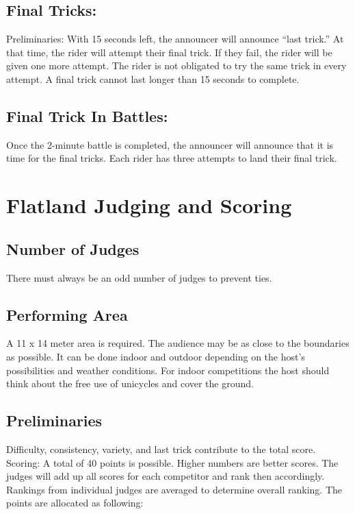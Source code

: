 \subsection{Final Tricks:}
Preliminaries: With 15 seconds left, the announcer will announce ``last trick.''
At that time, the rider will attempt their final trick.
If they fail, the rider will be given one more attempt.
The rider is not obligated to try the same trick in every attempt.
A final trick cannot last longer than 15 seconds to complete.

\subsection{Final Trick In Battles:}
Once the 2-minute battle is completed, the announcer will announce that it is time for the final tricks.
Each rider has three attempts to land their final trick.

\section{Flatland Judging and Scoring \label{sec:flat-street_flatland-judging-scoring}}

\subsection{Number of Judges}
There must always be an odd number of judges to prevent ties. 

\subsection{Performing Area}
A 11 x 14 meter area is required.
The audience may be as close to the boundaries as possible.
It can be done indoor and outdoor depending on the host's possibilities and weather conditions.
For indoor competitions the host should think about the free use of unicycles and cover the ground.

\subsection{Preliminaries}
Difficulty, consistency, variety, and last trick contribute to the total score.
Scoring: A total of 40 points is possible.
Higher numbers are better scores.
The judges will add up all scores for each competitor and rank then accordingly.
Rankings from individual judges are averaged to determine overall ranking.
The points are allocated as following: 

